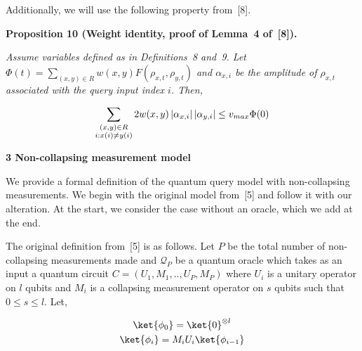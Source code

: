 \documentclass[10pt,a4paper]{article}
\begin{document}
Additionally, we will use the following property from [8].\par





\par\medskip\noindent\textbf{
\textbf{Proposition 10}\textbf{ }(Weight identity, proof of Lemma 4 of [8])\textbf{.}
}\par



\emph{Assume variables defined as in Definitions 8 and 9. Let $\Phi(t)=\sum_{(x,y)\in R}w(x,y)F(\rho_{x,t},\rho_{y,t})$ and $\alpha_{x,i}$ be the amplitude of $\rho_{x,t}$ associated with the query input index $i$. Then,}\par


\[\begin{gathered}
\displaystyle\sum_{\begin{subarray}{c}(x,y)\in R\\
i:x(i)\neq y(i)\end{subarray}}2w(x,y)\left|\alpha_{x,i}\right|\left|\alpha_{y,i}\right|\leq v_{max}\Phi(0)
\end{gathered}\]








\par\medskip\noindent\textbf{
3 Non-collapsing measurement model}\par




We provide a formal definition of the quantum query model with non-collapsing measurements. We begin with the original model from [5] and follow it with our alteration. At the start, we consider the case without an oracle, which we add at the end.\par




The original definition from [5] is as follows. Let $P$ be the total number of non-collapsing measurements made and $\mathcal{Q}_{P}$ be a quantum oracle which takes as an input a quantum circuit $C=(U_{1},M_{1},..,U_{P},M_{P})$ where $U_{i}$ is a unitary operator on $l$ qubits and $M_{i}$ is a collapsing measurement operator on $s$ qubits such that $0\leq s\leq l$. Let,\par


\[\begin{gathered}
\displaystyle\ket{\phi_{0}} \displaystyle=\ket{0}^{\otimes l} \\
\displaystyle\ket{\phi_{i}} \displaystyle=M_{i}U_{i}\ket{\phi_{i-1}}
\end{gathered}\]
\end{document}
